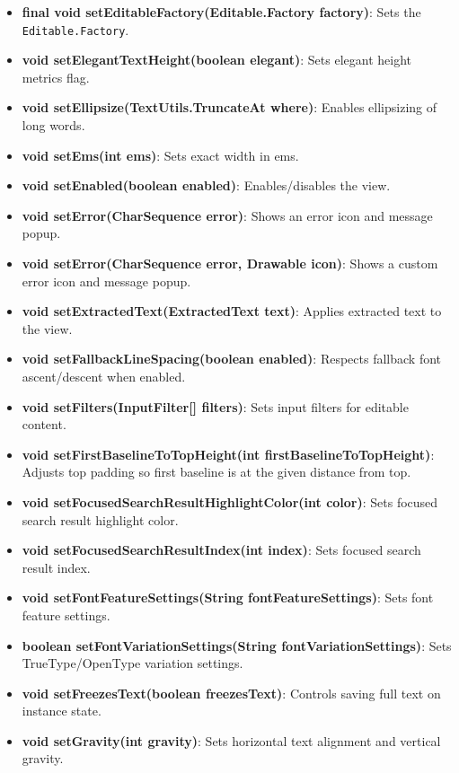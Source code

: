\documentclass{report}
\begin{document}
\begin{itemize}
\begin{itemize}
                \item \textbf{final void setEditableFactory(Editable.Factory factory)}: Sets the \texttt{Editable.Factory}.
                \item \textbf{void setElegantTextHeight(boolean elegant)}: Sets elegant height metrics flag.
                \item \textbf{void setEllipsize(TextUtils.TruncateAt where)}: Enables ellipsizing of long words.
                \item \textbf{void setEms(int ems)}: Sets exact width in ems.
                \item \textbf{void setEnabled(boolean enabled)}: Enables/disables the view.
                \item \textbf{void setError(CharSequence error)}: Shows an error icon and message popup.
                \item \textbf{void setError(CharSequence error, Drawable icon)}: Shows a custom error icon and message popup.
                \item \textbf{void setExtractedText(ExtractedText text)}: Applies extracted text to the view.
                \item \textbf{void setFallbackLineSpacing(boolean enabled)}: Respects fallback font ascent/descent when enabled.
                \item \textbf{void setFilters(InputFilter[] filters)}: Sets input filters for editable content.
                \item \textbf{void setFirstBaselineToTopHeight(int firstBaselineToTopHeight)}: Adjusts top padding so first baseline is at the given distance from top.
                \item \textbf{void setFocusedSearchResultHighlightColor(int color)}: Sets focused search result highlight color.
                \item \textbf{void setFocusedSearchResultIndex(int index)}: Sets focused search result index.
                \item \textbf{void setFontFeatureSettings(String fontFeatureSettings)}: Sets font feature settings.
                \item \textbf{boolean setFontVariationSettings(String fontVariationSettings)}: Sets TrueType/OpenType variation settings.
                \item \textbf{void setFreezesText(boolean freezesText)}: Controls saving full text on instance state.
                \item \textbf{void setGravity(int gravity)}: Sets horizontal text alignment and vertical gravity.

\end{itemize}
\end{itemize}
\end{document}
